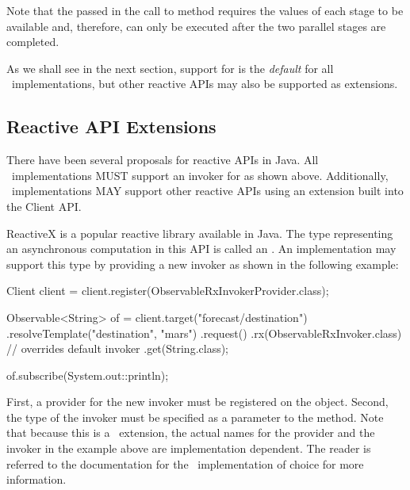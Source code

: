 Note that the  passed in the call to method  requires the values of each stage to be available and, therefore, can only be executed after the two parallel stages are completed. 

As we shall see in the next section, support for  is the \emph{default} for all \jaxrs\ implementations, but other reactive APIs may also be supported as extensions.

\subsection{Reactive API Extensions}
\label{reactive_api_extensions}

There have been several proposals for reactive APIs in Java. All \jaxrs\ implementations MUST support an invoker for  as shown above. Additionally, \jaxrs\ implementations MAY support other reactive APIs using an extension built into the Client API. 

ReactiveX \cite{rxjava} is a popular reactive library available in Java. The type representing an asynchronous computation in this API is called an . An implementation may support this type by providing a new invoker as shown in the following example:

\begin{listing}{1}
	Client client = client.register(ObservableRxInvokerProvider.class);
	
	Observable<String> of = client.target("forecast/{destination}")
	    .resolveTemplate("destination", "mars")
	    .request()
	    .rx(ObservableRxInvoker.class)    // overrides default invoker
	    .get(String.class);
	
	of.subscribe(System.out::println);
\end{listing}

First, a provider for the new invoker must be registered on the  object. Second, the type of the invoker must be specified as a parameter to the  method. Note that because this is a \jaxrs\ extension, the actual names for the provider and the invoker in the example above are implementation dependent. The reader is referred to the documentation for the \jaxrs\ implementation of choice for more information.

